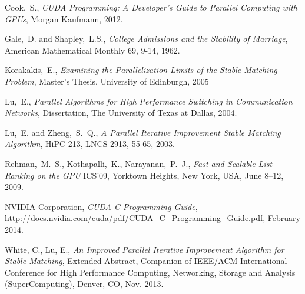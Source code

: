 \documentclass[journal]{IEEEtran}
\begin{document}
%
%
%
\begin{thebibliography}{1}


Cook,~S.,
    \emph{CUDA Programming: A Developer's Guide to Parallel Computing with GPUs},
    Morgan Kaufmann,
    2012.

Gale,~D. and Shapley,~L.S.,
    \emph{College Admissions and the Stability of Marriage},
    American Mathematical Monthly 69, 9-14,
    1962.

Korakakis,~E.,
    \emph{Examining the Parallelization Limits of the Stable Matching Problem},
    Master's Thesis, University of Edinburgh,
    2005

Lu,~E.,
    \emph{Parallel Algorithms for High Performance Switching in Communication Networks},
    Dissertation, The University of Texas at Dallas,
    2004.

Lu,~E. and Zheng,~S.~Q.,
    \emph{A Parallel Iterative Improvement Stable Matching Algorithm},
    HiPC 213, LNCS 2913, 55-65,
    2003.

Rehman,~M.~S., Kothapalli,~K., Narayanan,~P.~J.,
    \emph{Fast and Scalable List Ranking on the GPU}
    ICS'09, Yorktown Heights, New York, USA,
    June 8--12, 2009.

    NVIDIA Corporation,
    \emph{CUDA C Programming Guide},
    \url{http://docs.nvidia.com/cuda/pdf/CUDA_C_Programming_Guide.pdf},
    February 2014.

White, C., Lu, E.,
    \emph{An Improved Parallel Iterative Improvement Algorithm for Stable Matching},
    Extended Abstract,
    Companion of IEEE/ACM International Conference for High Performance Computing,
    Networking, Storage and Analysis (SuperComputing),
    Denver, CO,
    Nov. 2013.

\end{thebibliography}
\end{document}
